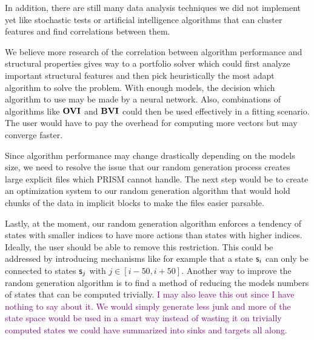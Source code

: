 In addition, there are still many data analysis techniques we did not implement yet like stochastic tests or artificial intelligence algorithms
that can cluster features and find correlations between them. 

We believe more research of the correlation between algorithm performance and structural properties gives way to a portfolio solver which could first
analyze important structural features and then pick heuristically the most adapt algorithm to solve the problem.
With enough models, the decision which algorithm to use may be made by a neural network.
Also, combinations of algorithms like $\mathbf{OVI}$ and $\mathbf{BVI}$ could then be used effectively in a fitting scenario.
The user would have to pay the overhead for computing more vectors but may converge faster.

Since algorithm performance may change drastically depending on the models size,
we need to resolve the issue that our random generation process creates large explicit files which PRISM cannot handle.
The next step would be to create an optimization system to our random generation algorithm that would hold chunks of the data in 
implicit blocks to make the files easier parsable.

Lastly, at the moment, our random generation algorithm enforces a tendency of states with smaller indices to have more actions than states with higher indices.
Ideally, the user should be able to remove this restriction.
This could be addressed by introducing mechanisms like for example that a state $\mathsf{s}_i$ can only be connected to states $\mathsf{s}_{j}$ with $j \in [i-50, i+50]$.
Another way to improve the random generation algorithm is to find a method of reducing the models numbers of states that can be computed trivially.
\textcolor{purple}{I may also leave this out since I have nothing to say about it. We would simply generate less junk and more of the state space
would be used in a smart way instead of wasting it on trivially computed states we could have summarized into sinks and targets all along.} 
